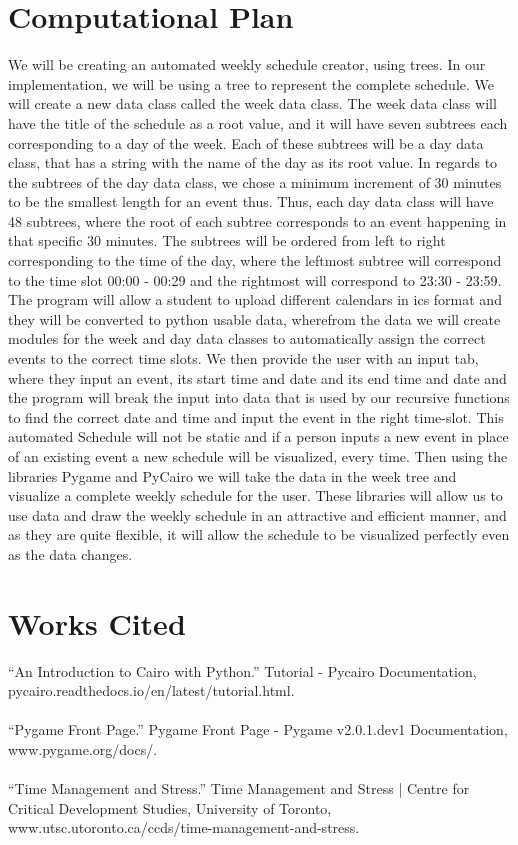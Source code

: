 \documentclass[fontsize=11pt]{article}
\begin{document}
\section*{Computational Plan}

We will be creating an automated weekly schedule creator, using trees. In our implementation, we will be using a tree to represent the complete schedule. We will create a new data class called the week data class. The week data class will have the title of the schedule as a root value, and it will have seven subtrees each corresponding to a day of the week. Each of these subtrees will be a day data class, that has a string with the name of the day as its root value. In regards to the subtrees of the day data class, we chose a minimum increment of 30 minutes to be the smallest length for an event thus. Thus, each day data class will have 48 subtrees, where the root of each subtree corresponds to an event happening in that specific 30 minutes. The subtrees will be ordered from left to right corresponding to the time of the day,  where the leftmost subtree will correspond to the time slot 00:00 - 00:29 and the rightmost will correspond to 23:30 - 23:59. 
The program will allow a student to upload different calendars in ics format and they will be converted to python usable data, wherefrom the data we will create modules for the week and day data classes to automatically assign the correct events to the correct time slots.
We then provide the user with an input tab, where they input an event, its start time and date and its end time and date and the program will break the input into data that is used by our recursive functions to find the correct date and time and input the event in the right time-slot. This automated Schedule will not be static and if a person inputs a new event in place of an existing event a new schedule will be visualized, every time. 
Then using the libraries Pygame and PyCairo we will take the data in the week tree and visualize a complete weekly schedule for the user. These libraries will allow us to use data and draw the weekly schedule in an attractive and efficient manner, and as they are quite flexible, it will allow the schedule to be visualized perfectly even as the data changes.

\section*{Works Cited}

“An Introduction to Cairo with Python.” Tutorial - Pycairo Documentation, pycairo.readthedocs.io/en/latest/tutorial.html. \\ \\
“Pygame Front Page.” Pygame Front Page - Pygame v2.0.1.dev1 Documentation, www.pygame.org/docs/. \\
\\ 
“Time Management and Stress.” Time Management and Stress | Centre for Critical Development Studies, University of Toronto, www.utsc.utoronto.ca/ccds/time-management-and-stress. \\
\end{document}
